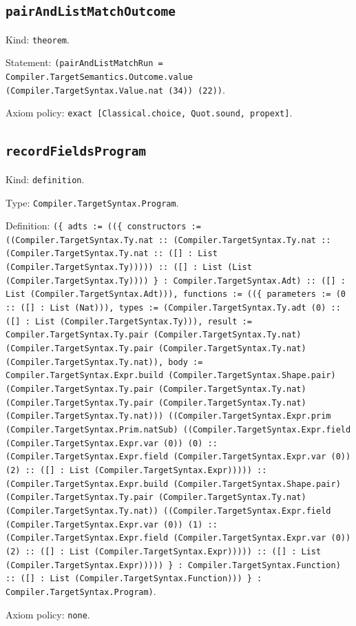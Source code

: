 \documentclass[11pt]{article}
\begin{document}
\subsection*{\texttt{pairAndListMatchOutcome}}
\noindent Kind: \texttt{theorem}.\par
\noindent Statement: \texttt{(pairAndListMatchRun = Compiler.TargetSemantics.Outcome.value (Compiler.TargetSyntax.Value.nat (34)) (22))}.\par
\noindent Axiom policy: \texttt{exact [Classical.choice, Quot.sound, propext]}.\par
\subsection*{\texttt{recordFieldsProgram}}
\noindent Kind: \texttt{definition}.\par
\noindent Type: \texttt{Compiler.TargetSyntax.Program}.\par
\noindent Definition: \texttt{(\{ adts := ((\{ constructors := ((Compiler.TargetSyntax.Ty.nat :: (Compiler.TargetSyntax.Ty.nat :: (Compiler.TargetSyntax.Ty.nat :: ([] : List (Compiler.TargetSyntax.Ty))))) :: ([] : List (List (Compiler.TargetSyntax.Ty)))) \} : Compiler.TargetSyntax.Adt) :: ([] : List (Compiler.TargetSyntax.Adt))), functions := ((\{ parameters := (0 :: ([] : List (Nat))), types := (Compiler.TargetSyntax.Ty.adt (0) :: ([] : List (Compiler.TargetSyntax.Ty))), result := Compiler.TargetSyntax.Ty.pair (Compiler.TargetSyntax.Ty.nat) (Compiler.TargetSyntax.Ty.pair (Compiler.TargetSyntax.Ty.nat) (Compiler.TargetSyntax.Ty.nat)), body := Compiler.TargetSyntax.Expr.build (Compiler.TargetSyntax.Shape.pair) (Compiler.TargetSyntax.Ty.pair (Compiler.TargetSyntax.Ty.nat) (Compiler.TargetSyntax.Ty.pair (Compiler.TargetSyntax.Ty.nat) (Compiler.TargetSyntax.Ty.nat))) ((Compiler.TargetSyntax.Expr.prim (Compiler.TargetSyntax.Prim.natSub) ((Compiler.TargetSyntax.Expr.field (Compiler.TargetSyntax.Expr.var (0)) (0) :: (Compiler.TargetSyntax.Expr.field (Compiler.TargetSyntax.Expr.var (0)) (2) :: ([] : List (Compiler.TargetSyntax.Expr))))) :: (Compiler.TargetSyntax.Expr.build (Compiler.TargetSyntax.Shape.pair) (Compiler.TargetSyntax.Ty.pair (Compiler.TargetSyntax.Ty.nat) (Compiler.TargetSyntax.Ty.nat)) ((Compiler.TargetSyntax.Expr.field (Compiler.TargetSyntax.Expr.var (0)) (1) :: (Compiler.TargetSyntax.Expr.field (Compiler.TargetSyntax.Expr.var (0)) (2) :: ([] : List (Compiler.TargetSyntax.Expr))))) :: ([] : List (Compiler.TargetSyntax.Expr))))) \} : Compiler.TargetSyntax.Function) :: ([] : List (Compiler.TargetSyntax.Function))) \} : Compiler.TargetSyntax.Program)}.\par
\noindent Axiom policy: \texttt{none}.\par
\end{document}

